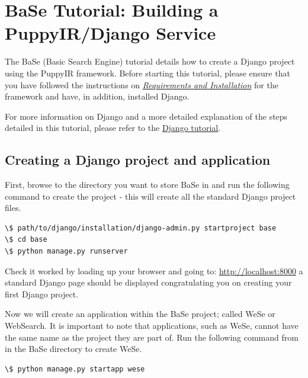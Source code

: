 \documentclass[letterpaper,10pt,english]{sphinxmanual}
\begin{document}
\section{BaSe Tutorial: Building a PuppyIR/Django Service}
\label{django-service:building-a-puppyir-django-service}\label{django-service::doc}\label{django-service:base-tutorial-building-a-puppyir-django-service}
The BaSe (Basic Search Engine) tutorial details how to create a Django project using the PuppyIR framework. Before starting this tutorial, please ensure that you have followed the instructions on {\hyperref[installation:requirements-and-installation]{\emph{Requirements and Installation}}} for the framework and have, in addition, installed Django.

For more information on Django and a more detailed explanation of the steps detailed in this tutorial, please refer to the \href{https://docs.djangoproject.com/en/1.3/intro/tutorial01/}{Django tutorial}.


\subsection{Creating a Django project and application}
\label{django-service:creating-a-django-project-and-application}
First, browse to the directory you want to store BaSe in and run the following command to create the project - this will create all the standard Django project files.

\begin{Verbatim}[commandchars=\\\{\}]
\$ path/to/django/installation/django-admin.py startproject base
\$ cd base
\$ python manage.py runserver
\end{Verbatim}

Check it worked by loading up your browser and going to: \href{http://localhost:8000}{http://localhost:8000} a standard Django page should be displayed congratulating you on creating your first Django project.

Now we will create an application within the BaSe project; called WeSe or WebSearch. It is important to note that applications, such as WeSe, cannot have the same name as the project they are part of. Run the following command from in the BaSe directory to create WeSe.

\begin{Verbatim}[commandchars=\\\{\}]
\$ python manage.py startapp wese
\end{Verbatim}
\end{document}
